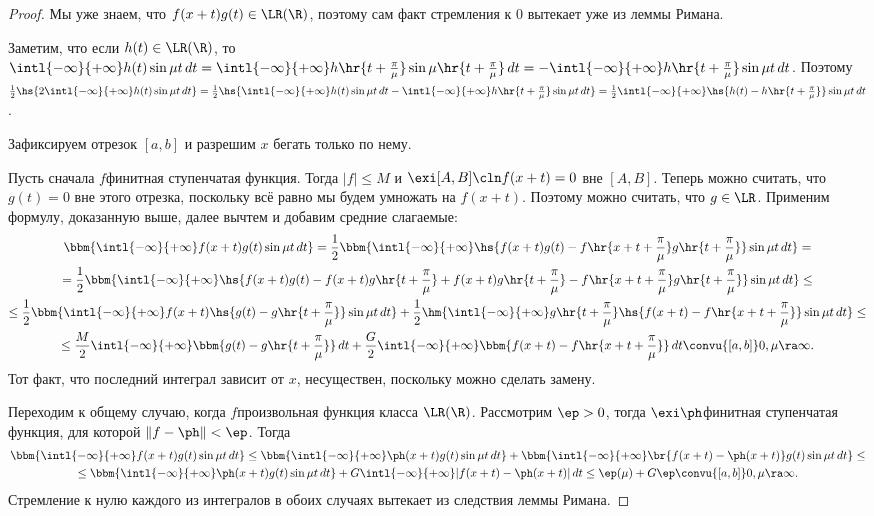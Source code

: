 \documentclass[a4paper]{article}
\newcommand{\tpm}{\hr{t + \frac{\pi}{\mu}}}
\newcommand{\xtpm}{\hr{x + t + \frac{\pi}{\mu}}}
\newcommand{\intlii}{\intl{-\infty}{+\infty}}
\begin{document}
\begin{proof}
Мы уже знаем, что $f(x+t)g(t) \in\LR(\R)$, поэтому сам факт стремления к 0 вытекает уже из леммы Римана.

Заметим, что если $h(t) \in\LR(\R)$, то $\intlii h(t) \sin \mu t \,d t = \intlii h \tpm \sin \mu
\tpm\,d t = -\intlii h\tpm \sin \mu t \,d t$. Поэтому $\frac{1}{2}\hs{2\intlii h(t)\sin \mu t
\,d t} = \frac{1}{2}\hs{\intlii h(t) \sin \mu t\,d t - \intlii h\tpm \sin \mu t \,d t}=
\frac{1}{2}\intlii\hs{h(t) - h\tpm}\sin \mu t \,d t$.

Зафиксируем отрезок $[a,b]$ и разрешим $x$ бегать только по нему.

Пусть сначала $f$\т финитная ступенчатая функция. Тогда $|f| \le M$ и $\exi [A,B]\cln f(x+t) = 0$ вне $[A,B]$. Теперь можно считать, что
$g(t) = 0$ вне этого отрезка, поскольку всё равно мы будем умножать на $f(x+t)$. Поэтому можно считать, что $g \in\LR$. Применим формулу, доказанную выше, далее
вычтем и добавим средние слагаемые:
\begin{multline}
\label{common.riemann.lemma}
\bbm{\intlii f(x+t)g(t)\sin \mu t \,d t} = \frac{1}{2}\bbm{\intlii\hs{f(x+t)g(t)-f\xtpm g\tpm}\sin \mu t \,d t}=\\
=\frac{1}{2}\bbm{\intlii\hs{f(x+t)g(t) - f(x+t)g\tpm + f(x+t)g\tpm-f\xtpm g\tpm}\sin \mu t \,d t}\le\\
\le\frac{1}{2}\bbm{\intlii f(x+t)\hs{g(t) - g\tpm}\sin \mu t\,d t} + \frac{1}{2}\hm{\intlii g\tpm\hs{f(x+t)-f\xtpm}
\sin \mu t \,d t}\le\\
\le\frac{M}{2}\intlii \bbm{g(t) - g\tpm}\,d t + \frac{G}{2}\intlii \bbm{f(x+t)-f\xtpm}\,dt
\convu{[a,b]} 0, \mu \ra \infty.
\end{multline}
Тот факт, что последний интеграл зависит от $x$, несуществен, поскольку можно сделать замену.

Переходим к общему случаю, когда $f$\т произвольная функция класса $\LR(\R)$. Рассмотрим $\ep >0$,
тогда $\exi \ph$\т финитная ступенчатая функция, для которой $\|f - \ph\| < \ep$. Тогда
\begin{multline*}
\bbm{\intlii f(x+t)g(t)\sin \mu t \,d t} \le \bbm{\intlii \ph(x+t)g(t)\sin \mu t\,dt}+
\bbm{\intlii \br{f(x+t)-\ph(x+t)}g(t)\sin \mu t \,d t} \le\\\le \bbm{\intlii \ph(x+t)g(t)\sin \mu t \,dt}
+ G \intlii |f(x+t)-\ph(x+t)|\,d t \le \ep(\mu) + G\ep \convu{[a,b]} 0, \mu \ra \infty.
\end{multline*}
Стремление к нулю каждого из интегралов в обоих случаях вытекает из следствия леммы Римана.
\end{proof}
\end{document}
